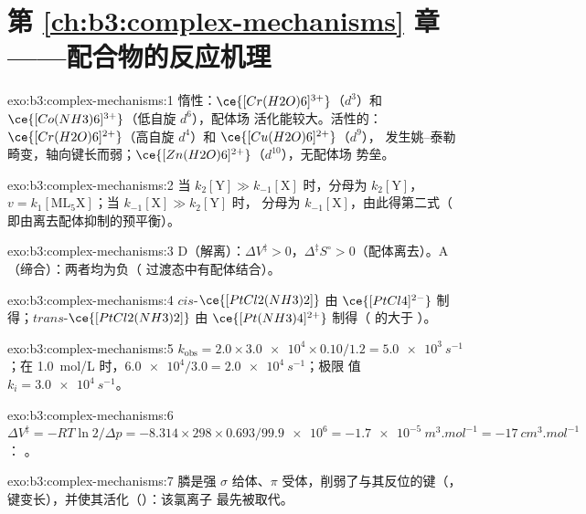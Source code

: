 \section*{第 \ref{ch:b3:complex-mechanisms} 章——配合物的反应机理}

\begin{solution}{exo:b3:complex-mechanisms:1}
惰性：$\ce{[Cr(H2O)6]^{3+}}$（$d^3$）和 $\ce{[Co(NH3)6]^{3+}}$（低自旋 $d^6$），配体场
活化能较大。活性的：$\ce{[Cr(H2O)6]^{2+}}$（高自旋 $d^4$）和 $\ce{[Cu(H2O)6]^{2+}}$（$d^9$），
发生姚–泰勒畸变，轴向键长而弱；$\ce{[Zn(H2O)6]^{2+}}$（$d^{10}$），无配体场
势垒。
\end{solution}

\begin{solution}{exo:b3:complex-mechanisms:2}
当 $k_2[\mathrm Y] \gg k_{-1}[\mathrm X]$ 时，分母为 $k_2[\mathrm Y]$，$v = k_1[\mathrm{ML_5X}]$；当 $k_{-1}[\mathrm X] \gg k_2[\mathrm Y]$ 时，
分母为 $k_{-1}[\mathrm X]$，由此得第二式（
即由离去配体抑制的预平衡）。
\end{solution}

\begin{solution}{exo:b3:complex-mechanisms:3}
D（解离）：$\Delta V^{\ddagger} > 0$，$\Delta^{\ddagger}S^\circ > 0$（配体离去）。A（缔合）：两者均为负（
过渡态中有配体结合）。
\end{solution}

\begin{solution}{exo:b3:complex-mechanisms:4}
$cis$-$\ce{[PtCl2(NH3)2]}$ 由 $\ce{[PtCl4]^{2-}}$ 制得；$trans$-$\ce{[PtCl2(NH3)2]}$ 由 $\ce{[Pt(NH3)4]^{2+}}$ 制得（
 的大于 ）。
\end{solution}

\begin{solution}{exo:b3:complex-mechanisms:5}
$k_{\mathrm{obs}} = 2.0 \times \num{3.0e4} \times 0.10/1.2 = \qty{5.0e3}{s^{-1}}$；在 \qty{1.0}{mol/L} 时，$\num{6.0e4}/3.0 = \qty{2.0e4}{s^{-1}}$；极限
值 $k_i = \qty{3.0e4}{s^{-1}}$。
\end{solution}

\begin{solution}{exo:b3:complex-mechanisms:6}
$\Delta V^{\ddagger} = -RT\ln2/\Delta p = -8.314 \times 298 \times 0.693/\num{99.9e6} = \qty{-1.7e-5}{m^3.mol^{-1}} = \qty{-17}{cm^3.mol^{-1}}$：
。
\end{solution}

\begin{solution}{exo:b3:complex-mechanisms:7}
膦是强 $\sigma$ 给体、$\pi$ 受体，削弱了与其反位的键（，键变长），并使其活化（）：该氯离子
最先被取代。
\end{solution}

